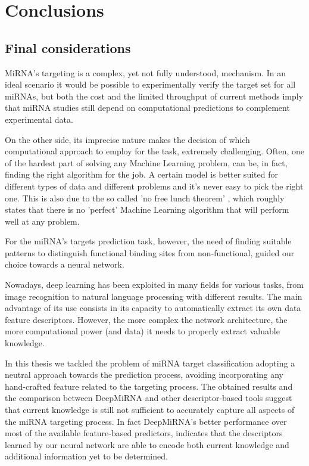 
\chapter{Conclusions} %

\label{Chapter7} %

\section{Final considerations}
MiRNA's targeting is a complex, yet not fully understood, mechanism. In an ideal scenario it would be possible to experimentally verify the target set for all miRNAs, but both the cost and the limited throughput of current methods imply that miRNA studies still depend on computational predictions to complement experimental data.

On the other side, its imprecise nature makes the decision of which computational approach to employ for the task, extremely challenging. Often, one of the hardest part of solving any Machine Learning problem, can be, in fact, finding the right algorithm for the job. A certain model is better suited for different types of data and different problems and it's never easy to pick the right one. This is also due to the so called 'no free lunch theorem' \cite{nfl}, which roughly states that there is no 'perfect' Machine Learning algorithm that will perform well at any problem.

For the miRNA's targets prediction task, however, the need of finding suitable patterns to distinguish functional binding sites from non-functional, guided our choice towards a  neural network. 

Nowadays, deep learning has been exploited in many fields for various tasks, from image recognition to natural language processing with different results. The main advantage of its use consists in its capacity to automatically extract its own data feature descriptors. However, the more complex the network architecture, the more computational power (and data) it needs to properly extract valuable knowledge.

In this thesis we tackled the problem of miRNA target classification adopting a neutral approach towards the prediction process, avoiding incorporating any hand-crafted feature related to the targeting process. The obtained results and the comparison between DeepMiRNA and other descriptor-based tools suggest that current knowledge is still not sufficient to accurately capture all aspects of the miRNA targeting process. In fact DeepMiRNA's better performance over most of the available feature-based predictors, indicates that the descriptors learned by our neural network are able to encode both current knowledge and additional information yet to be determined.   

